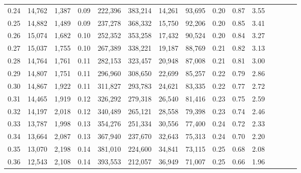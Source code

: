 \begin{tabular}{rrrcrrrrrrrrrrr}
0.24 &  14,762 &  1,387 &                                       0.09 &  222,396 &  383,214 &   14,261 &   93,695 &  0.20 &  0.87 &                         3.55 \\
0.25 &  14,882 &  1,489 &                                       0.09 &  237,278 &  368,332 &   15,750 &   92,206 &  0.20 &  0.85 &                         3.41 \\
0.26 &  15,074 &  1,682 &                                       0.10 &  252,352 &  353,258 &   17,432 &   90,524 &  0.20 &  0.84 &                         3.27 \\
0.27 &  15,037 &  1,755 &                                       0.10 &  267,389 &  338,221 &   19,187 &   88,769 &  0.21 &  0.82 &                         3.13 \\
0.28 &  14,764 &  1,761 &                                       0.11 &  282,153 &  323,457 &   20,948 &   87,008 &  0.21 &  0.81 &                         3.00 \\
0.29 &  14,807 &  1,751 &                                       0.11 &  296,960 &  308,650 &   22,699 &   85,257 &  0.22 &  0.79 &                         2.86 \\
0.30 &  14,867 &  1,922 &                                       0.11 &  311,827 &  293,783 &   24,621 &   83,335 &  0.22 &  0.77 &                         2.72 \\
0.31 &  14,465 &  1,919 &                                       0.12 &  326,292 &  279,318 &   26,540 &   81,416 &  0.23 &  0.75 &                         2.59 \\
0.32 &  14,197 &  2,018 &                                       0.12 &  340,489 &  265,121 &   28,558 &   79,398 &  0.23 &  0.74 &                         2.46 \\
0.33 &  13,787 &  1,998 &                                       0.13 &  354,276 &  251,334 &   30,556 &   77,400 &  0.24 &  0.72 &                         2.33 \\
0.34 &  13,664 &  2,087 &                                       0.13 &  367,940 &  237,670 &   32,643 &   75,313 &  0.24 &  0.70 &                         2.20 \\
0.35 &  13,070 &  2,198 &                                       0.14 &  381,010 &  224,600 &   34,841 &   73,115 &  0.25 &  0.68 &                         2.08 \\
0.36 &  12,543 &  2,108 &                                       0.14 &  393,553 &  212,057 &   36,949 &   71,007 &  0.25 &  0.66 &                         1.96 \\

\end{tabular}
